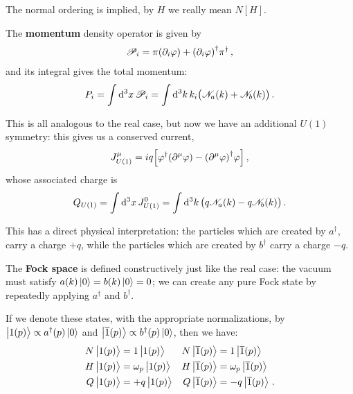\documentclass[main.tex]{subfiles}
\begin{document}
The normal ordering is implied, by \(H\) we really mean \(N[H]\).

The \textbf{momentum} density operator is given by 
%
\begin{align}
\mathscr{P}_{i} = \pi \qty(\partial_{i} \varphi )
+ \qty(\partial_{i} \varphi ) ^\dag \pi ^\dag
\,,
\end{align}
%
and its integral gives the total momentum: 
%
\begin{align}
P_i = \int \dd[3]{x} \mathscr{P}_{i} = \int \dd[3]{k} k_i \qty(\mathscr{N}_a (k) + \mathscr{N}_b (k))
\,.
\end{align}

This is all analogous to the real case, but now we have an additional \(U(1)\) symmetry: this gives us a conserved current, 
%
\begin{align}
J^{\mu }_{U(1)} = i q \qty[ \varphi ^\dag \qty(\partial^{\mu } \varphi )
- \qty(\partial^{\mu } \varphi )^\dag \varphi ] 
\,,
\end{align}
%
whose associated charge is 
%
\begin{align}
Q_{U(1)} = \int \dd[3]{x} J^{0}_{U(1)}
= \int \dd[3]{k} \qty(q \mathscr{N}_a (k) - q \mathscr{N}_b(k))
\,.
\end{align}

This has a direct physical interpretation: the particles which are created by \(a ^\dag\), carry a charge \(+q\), while the particles which are created by \(b ^\dag\) carry a charge \(-q\). 

The \textbf{Fock space} is defined constructively just like the real case: the vacuum must satisfy \(a (k) \ket{0} = b(k) \ket{0} = 0\); we can create any pure Fock state by repeatedly applying \(a ^\dag\) and \(b ^\dag\). 


\begin{claim}
If we denote these states, with the appropriate normalizations, by \(\ket{1(p)} \propto a ^\dag (p) \ket{0}\) and \(\ket{\overline{1} (p)} \propto b ^\dag(p) \ket{0}\), then we have: 
%
\begin{align} \label{eq:fock-one-particle-state-properties}
N \ket{1 (p)} &= 1 \ket{1 (p)} &
N \ket{\overline{1} (p)} &= 1 \ket{\overline{1} (p)}  \\
H \ket{1 (p)} &= \omega_{p} \ket{1 (p)} &
H \ket{\overline{1} (p)} &= \omega_{p} \ket{\overline{1} (p)}  \\
Q \ket{1 (p)} &= +q \ket{1 (p)} &
Q \ket{\overline{1} (p)} &= -q \ket{\overline{1} (p)}  
\,.
\end{align}
\end{claim}
\end{document}
